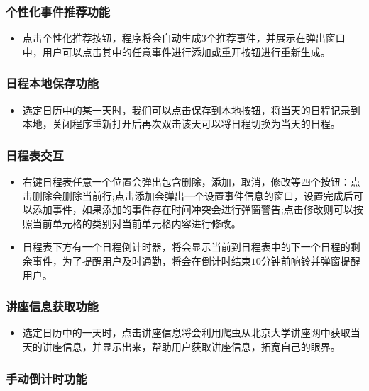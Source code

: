 \documentclass[11pt,hyperref,a4paper,UTF8]{ctexart}
\begin{document}
\begin{CJK}{UTF8}{gkai}
\subsubsection{个性化事件推荐功能}
\begin{itemize}
    \item 点击个性化推荐按钮，程序将会自动生成$3$个推荐事件，并展示在弹出窗口中，用户可以点击其中的任意事件进行添加或重开按钮进行重新生成。
\end{itemize}

\subsubsection{日程本地保存功能}
\begin{itemize}
    \item 选定日历中的某一天时，我们可以点击保存到本地按钮，将当天的日程记录到本地，关闭程序重新打开后再次双击该天可以将日程切换为当天的日程。
\end{itemize}


\subsubsection{日程表交互}
\begin{itemize}
    \item 右键日程表任意一个位置会弹出包含删除，添加，取消，修改等四个按钮：点击删除会删除当前行;点击添加会弹出一个设置事件信息的窗口，设置完成后可以添加事件，如果添加的事件存在时间冲突会进行弹窗警告;点击修改则可以按照当前单元格的类别对当前单元格内容进行修改。
    \item 日程表下方有一个日程倒计时器，将会显示当前到日程表中的下一个日程的剩余事件，为了提醒用户及时通勤，将会在倒计时结束$10$分钟前响铃并弹窗提醒用户。
\end{itemize}

\subsubsection{讲座信息获取功能}
\begin{itemize}
    \item 选定日历中的一天时，点击讲座信息将会利用爬虫从北京大学讲座网中获取当天的讲座信息，并显示出来，帮助用户获取讲座信息，拓宽自己的眼界。
\end{itemize}

\subsubsection{手动倒计时功能}



\end{CJK}
\end{document}
